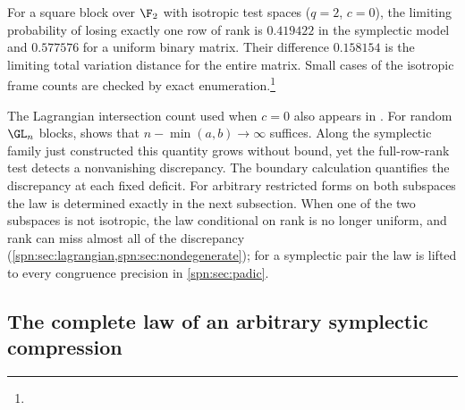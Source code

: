 \begin{example}\label{spn:ex:symplectic-F2}
For a square block over $\F_2$ with isotropic test spaces ($q=2$, $c=0$), the
limiting probability of losing exactly one row of rank is $0.419422$ in the
symplectic model and $0.577576$ for a uniform binary matrix. Their difference
$0.158154$ is the limiting total variation distance for the entire matrix.
Small cases of the isotropic frame counts are checked by exact
enumeration.\footnote{}
\end{example}

The Lagrangian intersection count used when $c=0$ also appears in
\cite[Corollary~2]{Kueng2015Qubit}. For random $\GL_n$ blocks,
\cite[Theorem~1.8]{Gorodetsky2026Statistics} shows that
$n-\min(a,b)\to\infty$ suffices. Along the symplectic family just constructed
this quantity grows without bound, yet the full-row-rank test detects a
nonvanishing discrepancy. The boundary calculation quantifies the discrepancy
at each fixed deficit. For arbitrary restricted forms on both subspaces the
law is determined exactly in the next subsection. When one of the two
subspaces is not isotropic, the law conditional on rank is no longer uniform,
and rank can miss almost all of the discrepancy
(\cref{spn:sec:lagrangian,spn:sec:nondegenerate}); for a symplectic pair the
law is lifted to every congruence precision in \cref{spn:sec:padic}.

\subsection{The complete law of an arbitrary symplectic compression}\label{spn:sec:complete-law}

